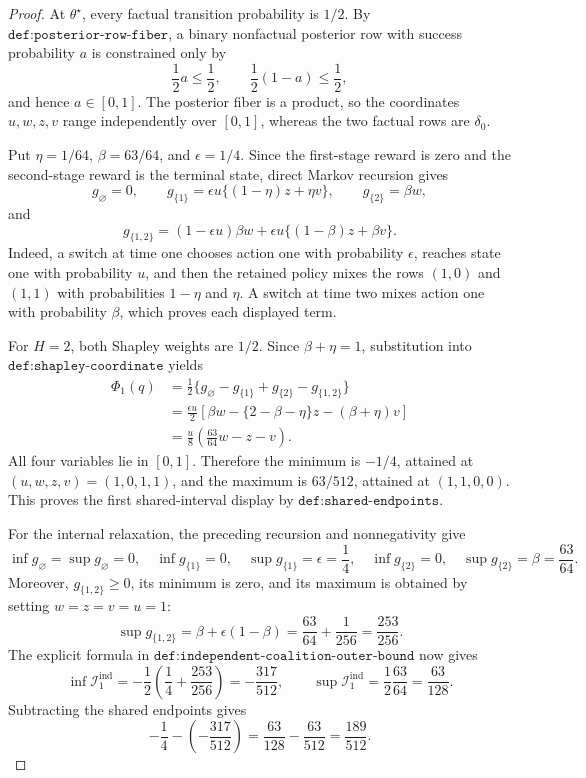 \documentclass{article}
\begin{document}
\begin{proof}
At \(\theta^\star\), every factual transition probability is \(1/2\).  By \(\texttt{def:posterior-row-fiber}\), a binary nonfactual posterior row with success probability \(a\) is constrained only by
\[
 \frac12a\le\frac12,
 \qquad
 \frac12(1-a)\le\frac12,
\]
and hence \(a\in[0,1]\).  The posterior fiber is a product, so the coordinates \(u,w,z,v\) range independently over \([0,1]\), whereas the two factual rows are \(\delta_0\).

Put \(\eta=1/64\), \(\beta=63/64\), and \(\epsilon=1/4\).  Since the first-stage reward is zero and the second-stage reward is the terminal state, direct Markov recursion gives
\[
 g_\varnothing=0,
 \qquad
 g_{\{1\}}=\epsilon u\{(1-\eta)z+\eta v\},
 \qquad
 g_{\{2\}}=\beta w,
\]
and
\[
 g_{\{1,2\}}=(1-\epsilon u)\beta w
 +\epsilon u\{(1-\beta)z+\beta v\}.
\]
Indeed, a switch at time one chooses action one with probability \(\epsilon\), reaches state one with probability \(u\), and then the retained policy mixes the rows \((1,0)\) and \((1,1)\) with probabilities \(1-\eta\) and \(\eta\).  A switch at time two mixes action one with probability \(\beta\), which proves each displayed term.

For \(H=2\), both Shapley weights are \(1/2\).  Since \(\beta+\eta=1\), substitution into \(\texttt{def:shapley-coordinate}\) yields
\[
\begin{aligned}
 \Phi_1(q)
 &=\frac12\{g_\varnothing-g_{\{1\}}+g_{\{2\}}-g_{\{1,2\}}\}\\
 &=\frac{\epsilon u}{2}
 \left[\beta w-\{2-\beta-\eta\}z-(\beta+\eta)v\right]\\
 &=\frac{u}{8}\left(\frac{63}{64}w-z-v\right).
\end{aligned}
\]
All four variables lie in \([0,1]\).  Therefore the minimum is \(-1/4\), attained at \((u,w,z,v)=(1,0,1,1)\), and the maximum is \(63/512\), attained at \((1,1,0,0)\).  This proves the first shared-interval display by \(\texttt{def:shared-endpoints}\).

For the internal relaxation, the preceding recursion and nonnegativity give
\[
 \inf g_\varnothing=\sup g_\varnothing=0,
 \quad \inf g_{\{1\}}=0,
 \quad \sup g_{\{1\}}=\epsilon=\frac14,
 \quad \inf g_{\{2\}}=0,
 \quad \sup g_{\{2\}}=\beta=\frac{63}{64}.
\]
Moreover, \(g_{\{1,2\}}\ge0\), its minimum is zero, and its maximum is obtained by setting \(w=z=v=u=1\):
\[
 \sup g_{\{1,2\}}
 =\beta+\epsilon(1-\beta)
 =\frac{63}{64}+\frac1{256}
 =\frac{253}{256}.
\]
The explicit formula in \(\texttt{def:independent-coalition-outer-bound}\) now gives
\[
 \inf\mathcal I_1^{\mathrm{ind}}
 =-\frac12\left(\frac14+\frac{253}{256}\right)
 =-\frac{317}{512},
 \qquad
 \sup\mathcal I_1^{\mathrm{ind}}
 =\frac12\frac{63}{64}=\frac{63}{128}.
\]
Subtracting the shared endpoints gives
\[
 -\frac14-\left(-\frac{317}{512}\right)
 =\frac{63}{128}-\frac{63}{512}
 =\frac{189}{512}.
\]


\end{proof}
\end{document}
